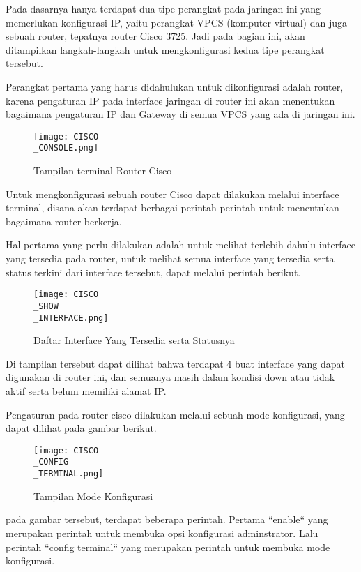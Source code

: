 \documentclass[12pt, a4paper]{article}
\begin{document}
  Pada dasarnya hanya terdapat dua tipe perangkat pada jaringan ini yang
  memerlukan konfigurasi IP, yaitu perangkat VPCS (komputer virtual) dan
  juga sebuah router, tepatnya router Cisco 3725. Jadi pada bagian ini, akan
  ditampilkan langkah-langkah untuk mengkonfigurasi kedua tipe perangkat 
  tersebut.

  Perangkat pertama yang harus didahulukan untuk dikonfigurasi adalah router,
  karena pengaturan IP pada interface jaringan di router ini akan menentukan
  bagaimana pengaturan IP dan Gateway di semua VPCS yang ada di jaringan ini.

  \newpage

  \begin{figure}[h]
      \centering
      \texttt{[image: CISCO\\\_CONSOLE.png]}
      \caption{\small{Tampilan terminal Router Cisco}}
  \end{figure}

  Untuk mengkonfigurasi sebuah router Cisco dapat dilakukan melalui interface
  terminal, disana akan terdapat berbagai perintah-perintah untuk menentukan
  bagaimana router berkerja.

  Hal pertama yang perlu dilakukan  adalah untuk melihat terlebih dahulu
  interface yang tersedia pada router, untuk melihat semua interface yang
  tersedia serta status terkini dari interface tersebut, dapat melalui 
  perintah berikut.

  \begin{figure}[h]
      \centering
      \texttt{[image: CISCO\\\_SHOW\\\_INTERFACE.png]}
      \caption{\small{Daftar Interface Yang Tersedia serta Statusnya}}
  \end{figure}

  Di tampilan tersebut dapat dilihat bahwa terdapat 4 buat interface yang dapat
  digunakan di router ini, dan semuanya masih dalam kondisi down atau tidak
  aktif serta belum memiliki alamat IP.

  Pengaturan pada router cisco dilakukan melalui sebuah
  mode konfigurasi, yang dapat dilihat pada gambar berikut.

  \begin{figure}[h]
      \centering
      \texttt{[image: CISCO\\\_CONFIG\\\_TERMINAL.png]}
      \caption{\small{Tampilan Mode Konfigurasi}}
  \end{figure}

  pada gambar tersebut, terdapat beberapa perintah. Pertama ``enable`` yang
  merupakan perintah untuk membuka opsi konfigurasi adminstrator. Lalu
  perintah ``config terminal`` yang merupakan perintah untuk membuka mode
  konfigurasi.
\end{document}

